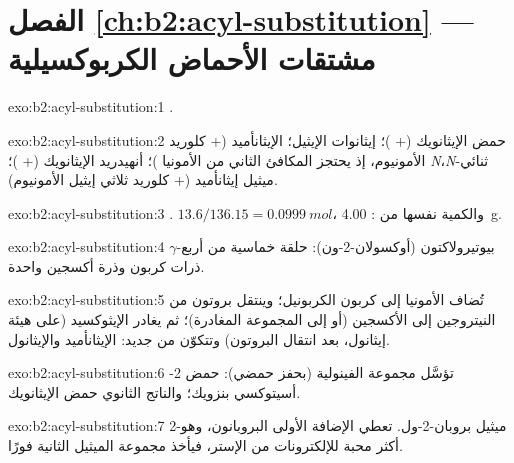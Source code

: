 \section*{الفصل \ref{ch:b2:acyl-substitution} --- مشتقات الأحماض الكربوكسيلية}

\begin{solution}{exo:b2:acyl-substitution:1}
.
\end{solution}

\begin{solution}{exo:b2:acyl-substitution:2}
حمض الإيثانويك (+ )؛ إيثانوات الإيثيل؛ الإيثانأميد (+ كلوريد الأمونيوم، إذ يحتجز المكافئ الثاني
من الأمونيا )؛ أنهيدريد الإيثانويك (+ )؛
\textit{N}،\textit{N}-ثنائي ميثيل إيثانأميد (+ كلوريد ثلاثي إيثيل الأمونيوم).
\end{solution}

\begin{solution}{exo:b2:acyl-substitution:3}
. $13.6/136.15 = \qty{0.0999}{mol}$، والكمية نفسها من
: \qty{4.00}{g}.
\end{solution}

\begin{solution}{exo:b2:acyl-substitution:4}
$\gamma$-بيوتيرولاكتون (أوكسولان-2-ون): حلقة خماسية من أربع ذرات كربون وذرة أكسجين واحدة.
\end{solution}

\begin{solution}{exo:b2:acyl-substitution:5}
تُضاف الأمونيا إلى كربون الكربونيل؛ وينتقل بروتون من النيتروجين إلى الأكسجين (أو إلى
المجموعة المغادرة)؛ ثم يغادر الإيثوكسيد (على هيئة إيثانول، بعد انتقال البروتون) وتتكوّن  من جديد:
الإيثانأميد والإيثانول.
\end{solution}

\begin{solution}{exo:b2:acyl-substitution:6}
تؤسَّل مجموعة  الفينولية (بحفز حمضي): حمض 2-أسيتوكسي بنزويك؛ والناتج الثانوي حمض الإيثانويك.
\end{solution}

\begin{solution}{exo:b2:acyl-substitution:7}
2-ميثيل بروبان-2-ول. تعطي الإضافة الأولى البروبانون، وهو أكثر محبة للإلكترونات من الإستر، فيأخذ
مجموعة الميثيل الثانية فورًا.
\end{solution}

